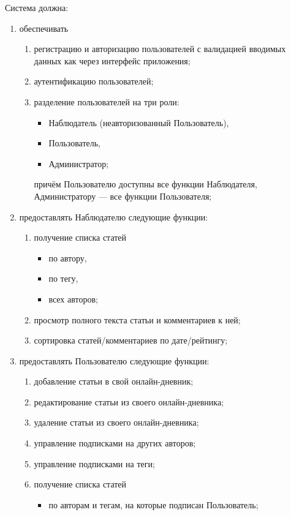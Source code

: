 \documentclass{bmstu-gost-7-32}
\begin{document}
Система должна:
\begin{enumerate}
	\item обеспечивать
	\begin{enumerate}
		\item регистрацию и авторизацию пользователей с валидацией вводимых данных как через интерфейс приложения;
		\item аутентификацию пользователей;
		\item разделение пользователей на три роли:
		\begin{itemize}
			\item Наблюдатель (неавторизованный Пользователь),
			\item Пользователь,
			\item Администратор;
		\end{itemize}
		причём Пользователю доступны все функции Наблюдателя, Администратору — все функции Пользователя;
	\end{enumerate}
	\item предоставлять Наблюдателю следующие функции:
	\begin{enumerate}
		\item получение списка статей
		\begin{itemize}
			\item по автору,
			\item по тегу,
			\item всех авторов;
		\end{itemize}
		\item просмотр полного текста статьи и комментариев к ней;
		\item сортировка статей/комментариев по дате/рейтингу;
	\end{enumerate}
	\item предоставлять Пользователю следующие функции:
	\begin{enumerate}
		\item добавление статьи в свой онлайн-дневник;
		\item редактирование статьи из своего онлайн-дневника;
		\item удаление статьи из своего онлайн-дневника;
		\item управление подписками на других авторов;
		\item управление подписками на теги;
		\item получение списка статей
		\begin{itemize}
			\item по авторам и тегам, на которые подписан Пользователь;

\end{itemize}
\end{enumerate}
\end{enumerate}
\end{document}
